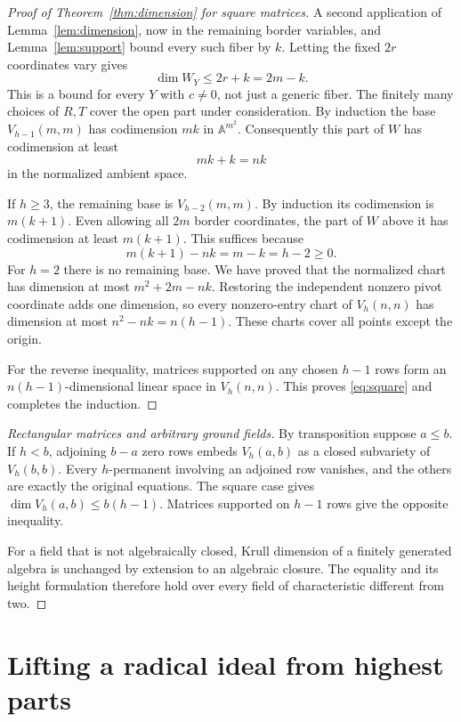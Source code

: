 \documentclass[11pt]{article}
\theoremstyle{remark}
\newcommand{\A}{\mathbb A}
\numberwithin{equation}{section}
\begin{document}
\begin{proof}[Proof of Theorem~\ref{thm:dimension} for square matrices]
A second application of Lemma~\ref{lem:dimension}, now in the
remaining border variables, and Lemma~\ref{lem:support} bound every
such fiber by $k$. Letting the fixed $2r$ coordinates vary gives
\begin{equation}\label{eq:fiber-bound}
 \dim W_Y\leq2r+k=2m-k.
\end{equation}
This is a bound for every $Y$ with $c\neq0$, not just a generic
fiber. The finitely many choices of $R,T$ cover the open part under
consideration. By induction the base $V_{h-1}(m,m)$ has codimension
$mk$ in $\A^{m^2}$. Consequently this part of $W$ has codimension
at least
\[
 mk+k=nk
\]
in the normalized ambient space.

If $h\geq3$, the remaining base is $V_{h-2}(m,m)$.
By induction its codimension is $m(k+1)$. Even allowing all $2m$
border coordinates, the part of $W$ above it has codimension at least
$m(k+1)$. This suffices because
\begin{equation}\label{eq:exceptional-dimension}
 m(k+1)-nk=m-k=h-2\geq0.
\end{equation}
For $h=2$ there is no remaining base. We have proved that the
normalized chart has dimension at most $m^2+2m-nk$.
Restoring the independent nonzero pivot coordinate adds one dimension,
so every nonzero-entry chart of $V_h(n,n)$ has dimension at most
$n^2-nk=n(h-1)$. These charts cover all points except the origin.

For the reverse inequality, matrices supported on any chosen $h-1$
rows form an $n(h-1)$-dimensional linear space in $V_h(n,n)$.
This proves \eqref{eq:square} and completes the induction.
\end{proof}

\begin{proof}[Rectangular matrices and arbitrary ground fields]
By transposition suppose $a\leq b$. If $h<b$, adjoining $b-a$ zero
rows embeds $V_h(a,b)$ as a closed subvariety of $V_h(b,b)$.
Every $h$-permanent involving an adjoined row vanishes, and the
others are exactly the original equations. The square case gives
$\dim V_h(a,b)\leq b(h-1)$. Matrices supported on $h-1$ rows give
the opposite inequality.

For a field that is not algebraically closed, Krull dimension of a
finitely generated algebra is unchanged by extension to an algebraic
closure. The equality and its height formulation therefore hold over
every field of characteristic different from two.
\end{proof}

\section{Lifting a radical ideal from highest parts}\label{sec:filtered}
\end{document}
